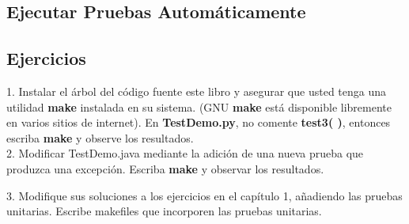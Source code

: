 \newpage

\subsection*{Ejecutar Pruebas Automáticamente}
\label{subsec:epa}


\subsection*{Ejercicios}
\label{subsec:ex}


    1. Instalar el árbol del código fuente este libro y asegurar que usted tenga una utilidad \textbf{make} instalada en su sistema. (GNU \textbf{make} está disponible libremente en varios sitios de internet). En \textbf{TestDemo.py}, no comente \textbf{test3( )}, entonces escriba \textbf{make} y observe los resultados. \\
    
    2. Modificar TestDemo.java mediante la adición de una nueva prueba que produzca una excepción. Escriba \textbf{make} y observar los resultados.\newline
    
    3. Modifique sus soluciones a los ejercicios en el capítulo 1, añadiendo las pruebas unitarias. Escribe makefiles que incorporen las pruebas unitarias. \newline
            